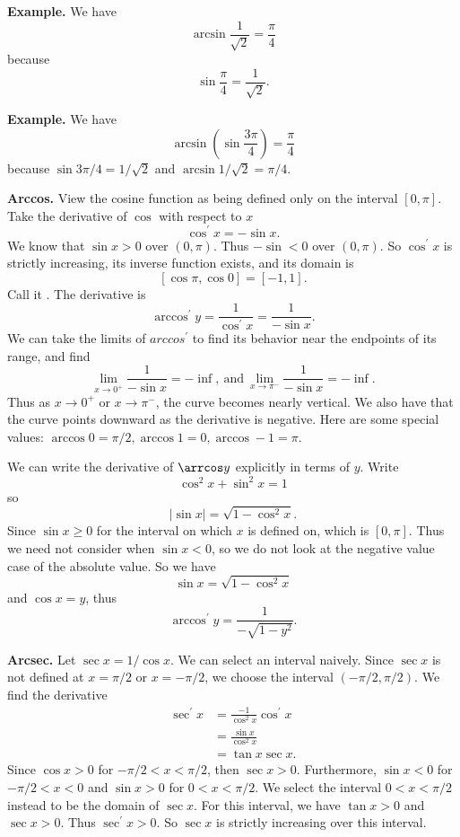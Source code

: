       \textbf{Example.} We have
      \[\arcsin \frac{1}{\sqrt{2}} = \frac{\pi}{4}\]
      because
      \[\sin \frac{\pi}{4} = \frac{1}{\sqrt{2}}.\]

      \textbf{Example.} We have
      \[\arcsin(\sin \frac{3\pi}{4}) = \frac{\pi}{4}\]
      because $\sin 3\pi/4 = 1/\sqrt{2}$ and $\arcsin 1/\sqrt{2} = \pi/4$.

      \textbf{Arccos.} View the cosine function as being defined only on the interval $[0, \pi]$. Take the derivative of $\cos$ with respect to $x$
      \[\cos^\prime x = -\sin x.\]
      We know that $\sin x > 0$ over $(0, \pi)$. Thus $-\sin < 0$ over $(0, \pi)$. So $\cos^\prime x$ is strictly increasing, its inverse function exists, and its domain is
      \[[\cos \pi, \cos 0] = [-1, 1].\]
      Call it \arccos. The derivative is
      \[\arccos^\prime y = \frac{1}{\cos^\prime x} = \frac{1}{-\sin x}.\]
      We can take the limits of $arccos^\prime$ to find its behavior near the endpoints of its range, and find
      \[\lim_{x\to0^+} \frac{1}{-\sin x} = -\inf,\: \text{and}\: \lim_{x\to\pi^-} \frac{1}{-\sin x} = -\inf.\]
      Thus as $x\to0^+$ or $x\to\pi^-$, the curve becomes nearly vertical. We also have that the curve points downward as the derivative is negative. Here are some special values: $\arccos 0 = \pi/2, \arccos 1 = 0, \arccos -1 = \pi$.

      We can write the derivative of $\arrcos y$ explicitly in terms of $y$. Write
      \[\cos^2 x + \sin^2 x = 1\]
      so
      \[|\sin x| = \sqrt{1 - \cos^2 x}.\]
      Since $\sin x \ge 0$ for the interval on which $x$ is defined on, which is $[0, \pi]$. Thus we need not consider when $\sin x < 0$, so we do not look at the negative value case of the absolute value. So we have
      \[\sin x = \sqrt{1 - \cos^2 x}\]
      and $\cos x = y$, thus
      \[\arccos^\prime y = \frac{1}{-\sqrt{1 - y^2}}.\]

      \textbf{Arcsec.} Let $\sec x = 1/\cos x$. We can select an interval naively. Since $\sec x$ is not defined at $x = \pi/2$ or $x = -\pi/2$, we choose the interval $(-\pi/2, \pi/2)$. We find the derivative
      \begin{align*}
        \sec^\prime x &= \frac{-1}{\cos^2 x} \cos^\prime x\\
        &= \frac{\sin x}{\cos^2 x}\\
        &= \tan x \sec x.
      \end{align*}
      Since $\cos x > 0$ for $-\pi/2 < x < \pi/2$, then $\sec x > 0$. Furthermore, $\sin x < 0$ for $-\pi/2 < x < 0$ and $\sin x > 0$ for $0 < x < \pi/2$. We select the interval $0 < x < \pi/2$ instead to be the domain of $\sec x$. For this interval, we have $\tan x > 0$ and $\sec x > 0$. Thus $\sec^\prime x > 0$. So $\sec x$ is strictly increasing over this interval.

